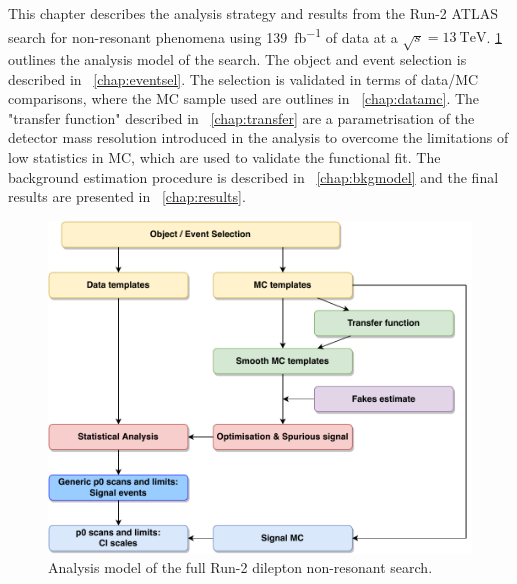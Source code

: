 This chapter describes the analysis strategy and results from the Run-2 ATLAS search for non-resonant phenomena using \SI{139}{\femto\barn^{-1}} of data at a $\sqrt{s}=\SI{13}{\tera\electronvolt}$. \cref{fig:nonres:intro:analysismodel} outlines the analysis model of the search. The object and event selection is described in ~\cref{chap:eventsel}. The selection is validated in terms of data/MC comparisons, where the MC sample used are outlines in ~\cref{chap:datamc}. The "transfer function" described in ~\cref{chap:transfer} are a parametrisation of the detector mass resolution introduced in the analysis to overcome the limitations of low statistics in MC, which are used to validate the functional fit. The background estimation procedure is described in ~\cref{chap:bkgmodel} and the final results are presented in ~\cref{chap:results}.

\begin{figure}[h]
    \centering
    \includegraphics[width=\mediumfigwidth]{figures/analysis/introduction/AnalysisOverview.pdf}
    \caption[Analysis model of the full Run-2 dilepton non-resonant search]{Analysis model of the full Run-2 dilepton non-resonant search.}
    \label{fig:nonres:intro:analysismodel}
\end{figure}